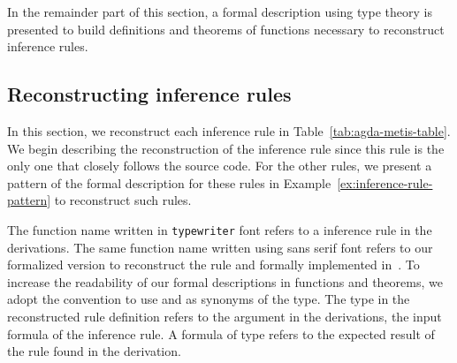 \documentclass[../main.tex]{subfiles}
\begin{document}
In the remainder part of this section, a formal description using
type theory is presented to build definitions and theorems of
functions necessary to reconstruct \Metis inference rules.


\subsection{Reconstructing \Metis inference rules}
\label{ssec:emulating-inferences}

In this section, we reconstruct each \Metis inference rule in
Table~\ref{tab:agda-metis-table}.
We begin describing the reconstruction of the \strip inference rule
since this rule  is the only one that closely follows the \Metis
source code. For the other rules, we present a pattern of the formal
description for these rules in
Example~\ref{ex:inference-rule-pattern} to reconstruct such rules.


\begin{notation}
  The function name written in \texttt{typewriter} font refers to a
  \Metis inference rule in the \TSTP derivations. The same function
  name written using
  \textsf{sans serif} font refers to our formalized version to
  reconstruct the rule and formally implemented in~\cite{AgdaMetis}.
  To increase the readability of our formal descriptions in
  functions and theorems, we adopt
  the convention to use \Source and \Target as synonyms of the \Prop
  type. The \Source type in the reconstructed rule definition refers
  to the argument in the \TSTP derivations, \ie the input formula of
  the inference rule. A formula of \Target type refers to the
  expected result of the rule found in the \TSTP derivation.
\end{notation}


\end{document}
